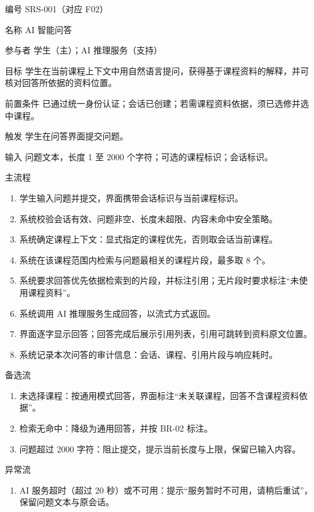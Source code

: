 \documentclass[12pt,a4paper]{ctexart}
\newenvironment{reqcard}
  {\begin{description}[leftmargin=6.2em,style=nextline,itemsep=4pt]}
  {\end{description}}
\begin{document}
\begin{reqcard}
  \item[编号] SRS-001（对应 F02）
  \item[名称] AI 智能问答
  \item[参与者] 学生（主）；AI 推理服务（支持）
  \item[目标] 学生在当前课程上下文中用自然语言提问，获得基于课程资料的解释，并可核对回答所依据的资料位置。
  \item[前置条件] 已通过统一身份认证；会话已创建；若需课程资料依据，须已选修并选中课程。
  \item[触发] 学生在问答界面提交问题。
  \item[输入] 问题文本，长度 1 至 2000 个字符；可选的课程标识；会话标识。
  \item[主流程]
    \begin{enumerate}[label=M\arabic*,leftmargin=2.6em]
      \item 学生输入问题并提交，界面携带会话标识与当前课程标识。
      \item 系统校验会话有效、问题非空、长度未超限、内容未命中安全策略。
      \item 系统确定课程上下文：显式指定的课程优先，否则取会话当前课程。
      \item 系统在该课程范围内检索与问题最相关的课程片段，最多取 8 个。
      \item 系统要求回答优先依据检索到的片段，并标注引用；无片段时要求标注“未使用课程资料”。
      \item 系统调用 AI 推理服务生成回答，以流式方式返回。
      \item 界面逐字显示回答；回答完成后展示引用列表，引用可跳转到资料原文位置。
      \item 系统记录本次问答的审计信息：会话、课程、引用片段与响应耗时。
    \end{enumerate}
  \item[备选流]
    \begin{enumerate}[label=A\arabic*,leftmargin=2.6em]
      \item 未选择课程：按通用模式回答，界面标注“未关联课程，回答不含课程资料依据”。
      \item 检索无命中：降级为通用回答，并按 BR-02 标注。
      \item 问题超过 2000 字符：阻止提交，提示当前长度与上限，保留已输入内容。
    \end{enumerate}
  \item[异常流]
    \begin{enumerate}[label=E\arabic*,leftmargin=2.6em]
      \item AI 服务超时（超过 20 秒）或不可用：提示“服务暂时不可用，请稍后重试”，保留问题文本与原会话。

\end{enumerate}
\end{reqcard}
\end{document}
